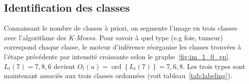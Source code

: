						
			



			\subsection{Identification des classes}
	 Connaissant le nombre de classes à priori, on segmente l'image en trois classes avec l'algorithme des \emph{K-Means}. Pour savoir à quel type (e.g foie, tumeur) correspond chaque classe, le moteur d'inférence réorganise les classes trouvées à l'étape précédente par intensité croissante selon le graphe~\ref{fig:im_1_0_gp}. $L_t(7) = {7,8,6}$ devient $O_t(u)= \operatorname{ord} \left\{ L_t(7) \right\} = {7,6,8}$. Les trois types sont maintenant associés aux trois classes ordonnées (voit tableau~\ref{tab:labeling}).


